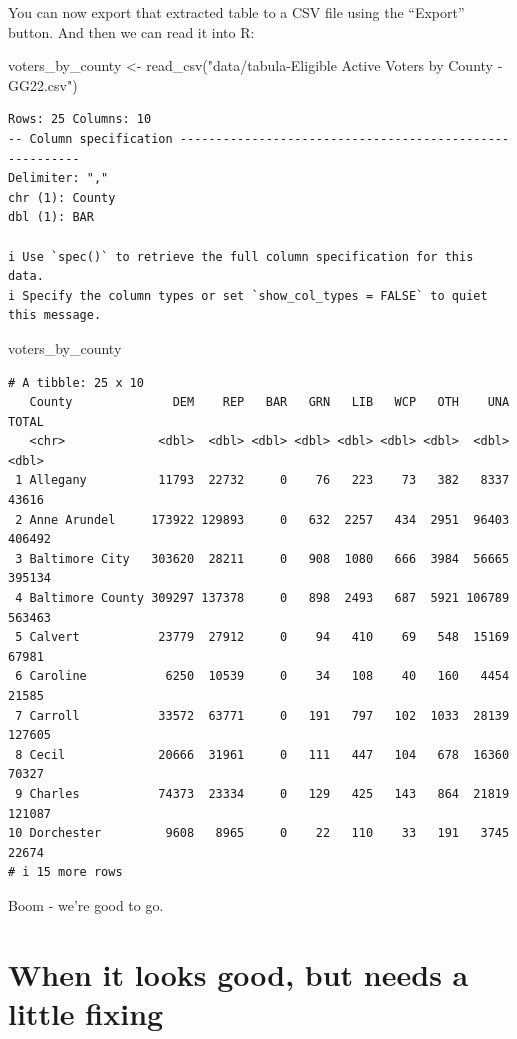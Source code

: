 \documentclass[
  letterpaper,
  DIV=11,
  numbers=noendperiod]{scrreprt}
\newenvironment{Shaded}{\begin{snugshade}}{\end{snugshade}}
\newcommand{\FunctionTok}[1]{\textcolor[rgb]{0.28,0.35,0.67}{#1}}
\newcommand{\NormalTok}[1]{\textcolor[rgb]{0.00,0.23,0.31}{#1}}
\newcommand{\OtherTok}[1]{\textcolor[rgb]{0.00,0.23,0.31}{#1}}
\newcommand{\StringTok}[1]{\textcolor[rgb]{0.13,0.47,0.30}{#1}}
\begin{document}
You can now export that extracted table to a CSV file using the
``Export'' button. And then we can read it into R:

\begin{Shaded}
\begin{Highlighting}[]
\NormalTok{voters\_by\_county }\OtherTok{\textless{}{-}} \FunctionTok{read\_csv}\NormalTok{(}\StringTok{"data/tabula{-}Eligible Active Voters by County {-} GG22.csv"}\NormalTok{)}
\end{Highlighting}
\end{Shaded}

\begin{verbatim}
Rows: 25 Columns: 10
-- Column specification --------------------------------------------------------
Delimiter: ","
chr (1): County
dbl (1): BAR

i Use `spec()` to retrieve the full column specification for this data.
i Specify the column types or set `show_col_types = FALSE` to quiet this message.
\end{verbatim}

\begin{Shaded}
\begin{Highlighting}[]
\NormalTok{voters\_by\_county}
\end{Highlighting}
\end{Shaded}

\begin{verbatim}
# A tibble: 25 x 10
   County              DEM    REP   BAR   GRN   LIB   WCP   OTH    UNA  TOTAL
   <chr>             <dbl>  <dbl> <dbl> <dbl> <dbl> <dbl> <dbl>  <dbl>  <dbl>
 1 Allegany          11793  22732     0    76   223    73   382   8337  43616
 2 Anne Arundel     173922 129893     0   632  2257   434  2951  96403 406492
 3 Baltimore City   303620  28211     0   908  1080   666  3984  56665 395134
 4 Baltimore County 309297 137378     0   898  2493   687  5921 106789 563463
 5 Calvert           23779  27912     0    94   410    69   548  15169  67981
 6 Caroline           6250  10539     0    34   108    40   160   4454  21585
 7 Carroll           33572  63771     0   191   797   102  1033  28139 127605
 8 Cecil             20666  31961     0   111   447   104   678  16360  70327
 9 Charles           74373  23334     0   129   425   143   864  21819 121087
10 Dorchester         9608   8965     0    22   110    33   191   3745  22674
# i 15 more rows
\end{verbatim}

Boom - we're good to go.

\hypertarget{when-it-looks-good-but-needs-a-little-fixing}{%
\section{When it looks good, but needs a little
fixing}\label{when-it-looks-good-but-needs-a-little-fixing}}
\end{document}

